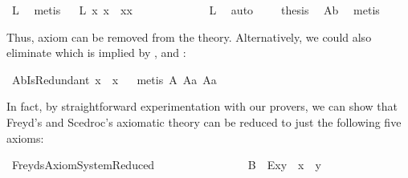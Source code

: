 \begin{isabellebody}
\ L{}{}\ \isamarkupfalse%
\ metis\isanewline
\ \isamarkupfalse%
\ L{}{}{\isacharcolon}\ {\isachardoublequoteopen}{\isasymforall}x{\isachardot}\ {\isacharparenleft}{\isasymbox}x{\isacharparenright}{\isasymbox}\ {\isasymapprox}\ {\isacharparenleft}{\isasymbox}x{\isacharparenright}{\isasymcdot}{\isacharparenleft}{\isacharparenleft}{\isasymbox}x{\isacharparenright}{\isasymbox}{\isacharparenright}{\isachardoublequoteclose}\ \ \ \ \ \ \ \ \ \ \ \ \isamarkupfalse%
\ L{}{}\ \isamarkupfalse%
\ auto\isanewline
\ \isamarkupfalse%
\ \isamarkupfalse%
\ {\isacharquery}thesis\ \isamarkupfalse%
\ A{}b\ \isamarkupfalse%
\ metis\isanewline
{}\isamarkupfalse%
%
\endisatagproof
{\isafoldproof}%
%
\isadelimproof
%
\endisadelimproof
%
\begin{isamarkuptext}%
Thus, axiom  can be removed from the theory. Alternatively, 
we could also eliminate  which is implied by , 
 and :%
\end{isamarkuptext}%
\isamarkuptrue%
\isamarkupfalse%
\ A{}bIsRedundant{\isacharunderscore}{}{\isacharcolon}\ {\isachardoublequoteopen}{\isasymbox}{\isacharparenleft}x{\isasymbox}{\isacharparenright}\ {\isasymapprox}\ {\isasymbox}x{\isachardoublequoteclose}%
\isadelimproof
\ %
\endisadelimproof
%
\isatagproof
{}\isamarkupfalse%
\ {\isacharparenleft}metis\ A{}\ A{}a\ A{}a{\isacharparenright}%
\endisatagproof
{\isafoldproof}%
%
\isadelimproof
%
\endisadelimproof
%
\begin{isamarkuptext}%
In fact, by straightforward experimentation with our provers, we can show that Freyd's and 
Scedroc's axiomatic theory can be reduced to just the following five axioms:%
\end{isamarkuptext}%
\isamarkuptrue%
\isamarkupfalse%
\ FreydsAxiomSystemReduced\ \ \ \ \ \ \ \ \ \ \ \ \ \ \ \isanewline
\ B{}{\isacharcolon}\ \ {\isachardoublequoteopen}\isactrlbold E{\isacharparenleft}x{\isasymcdot}y{\isacharparenright}\ \isactrlbold {\isasymleftrightarrow}\ {\isacharparenleft}{\isacharparenleft}x{\isasymbox}{\isacharparenright}\ {\isasymapprox}\ {\isacharparenleft}{\isasymbox}y{\isacharparenright}{\isacharparenright}{\isachardoublequoteclose}\ \isanewline

\end{isabellebody}
